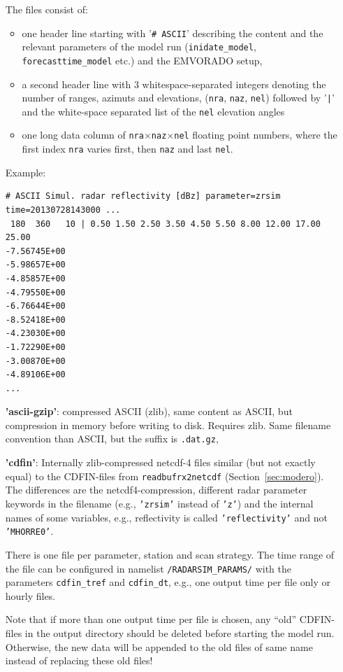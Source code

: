\documentclass[10pt,a4paper,twoside,headinclude,footinclude,parskip=half]{scrartcl}
\newcommand{\srcform}[1]{\mbox{\texttt{#1}}\xspace}%
\begin{document}
\begin{itemize}
    The files consist of:
    \begin{itemize}
    \item one header line starting with '\srcform{\# ASCII}' describing the content and the relevant parameters of the model
      run (\srcform{inidate_model}, \srcform{forecasttime_model} etc.) and the EMVORADO setup,
    \item a second header line with 3 whitespace-separated integers denoting the number of ranges, azimuts and elevations,
      (\srcform{nra}, \srcform{naz}, \srcform{nel}) followed by '\verb+|+' and the white-space separated list of the \srcform{nel} elevation angles
    \item one long data column of \srcform{nra}$\times$\srcform{naz}$\times$\srcform{nel}
      floating point numbers, where the first index \srcform{nra} varies first, then \srcform{naz} and last \srcform{nel}.
    \end{itemize}
    Example:
\begin{verbatim}
# ASCII Simul. radar reflectivity [dBz] parameter=zrsim time=20130728143000 ...
 180  360   10 | 0.50 1.50 2.50 3.50 4.50 5.50 8.00 12.00 17.00 25.00
-7.56745E+00
-5.98657E+00
-4.85857E+00
-4.79550E+00
-6.76644E+00
-8.52418E+00
-4.23030E+00
-1.72290E+00
-3.00870E+00
-4.89106E+00
...
\end{verbatim}
  \item[\textbf{'ascii-gzip'}:] compressed ASCII (zlib), same content as ASCII, but compression in memory before writing to disk.
    Requires zlib. Same filename convention than ASCII, but the suffix is \verb|.dat.gz|,
  \item[\textbf{'cdfin'}:] Internally zlib-compressed netcdf-4 files similar (but not exactly equal) to the CDFIN-files from \srcform{readbufrx2netcdf} (Section~\ref{sec:modero}). The differences are the netcdf4-compression, different radar parameter keywords in the filename (e.g., \srcform{'zrsim'} instead of \srcform{'z'}) and the internal names of some variables, e.g., reflectivity is called \srcform{'reflectivity'} and not \srcform{'MHORRE0'}.

    There is one file per parameter, station and scan strategy. The time range of
    the file can be configured in namelist \srcform{/RADARSIM\_PARAMS/} with the parameters \srcform{cdfin\_tref} and \srcform{cdfin\_dt},
    e.g., one output time per file only or hourly files.

    Note that if more than one output time per file is chosen, any ``old'' CDFIN-files in the output directory should
    be deleted before starting the model run. Otherwise, the new data will be appended to the old files of
    same name instead of replacing these old files!


\end{itemize}
\end{document}

